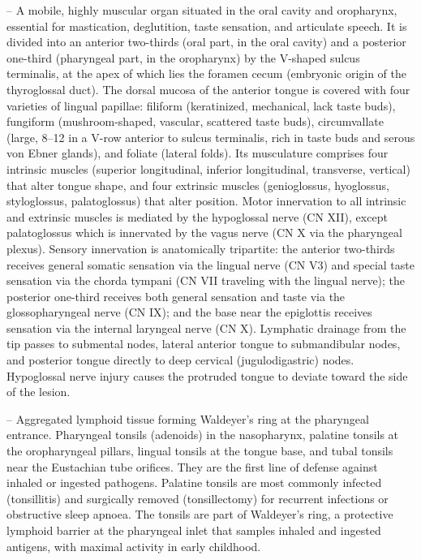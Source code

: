 -- A mobile, highly muscular organ situated in the oral cavity and oropharynx, essential for mastication, deglutition, taste sensation, and articulate speech. It is divided into an anterior two-thirds (oral part, in the oral cavity) and a posterior one-third (pharyngeal part, in the oropharynx) by the V-shaped sulcus terminalis, at the apex of which lies the foramen cecum (embryonic origin of the thyroglossal duct). The dorsal mucosa of the anterior tongue is covered with four varieties of lingual papillae: filiform (keratinized, mechanical, lack taste buds), fungiform (mushroom-shaped, vascular, scattered taste buds), circumvallate (large, 8--12 in a V-row anterior to sulcus terminalis, rich in taste buds and serous von Ebner glands), and foliate (lateral folds). Its musculature comprises four intrinsic muscles (superior longitudinal, inferior longitudinal, transverse, vertical) that alter tongue shape, and four extrinsic muscles (genioglossus, hyoglossus, styloglossus, palatoglossus) that alter position. Motor innervation to all intrinsic and extrinsic muscles is mediated by the hypoglossal nerve (CN XII), except palatoglossus which is innervated by the vagus nerve (CN X via the pharyngeal plexus). Sensory innervation is anatomically tripartite: the anterior two-thirds receives general somatic sensation via the lingual nerve (CN V3) and special taste sensation via the chorda tympani (CN VII traveling with the lingual nerve); the posterior one-third receives both general sensation and taste via the glossopharyngeal nerve (CN IX); and the base near the epiglottis receives sensation via the internal laryngeal nerve (CN X). Lymphatic drainage from the tip passes to submental nodes, lateral anterior tongue to submandibular nodes, and posterior tongue directly to deep cervical (jugulodigastric) nodes. Hypoglossal nerve injury causes the protruded tongue to deviate toward the side of the lesion.

-- Aggregated lymphoid tissue forming Waldeyer's ring at the pharyngeal entrance. Pharyngeal tonsils (adenoids) in the nasopharynx, palatine tonsils at the oropharyngeal pillars, lingual tonsils at the tongue base, and tubal tonsils near the Eustachian tube orifices. They are the first line of defense against inhaled or ingested pathogens. Palatine tonsils are most commonly infected (tonsillitis) and surgically removed (tonsillectomy) for recurrent infections or obstructive sleep apnoea. The tonsils are part of Waldeyer's ring, a protective lymphoid barrier at the pharyngeal inlet that samples inhaled and ingested antigens, with maximal activity in early childhood.

